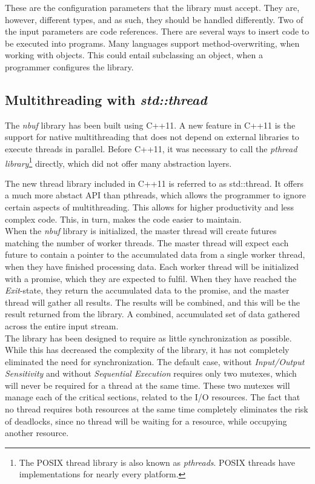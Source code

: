 \documentclass[a4paper]{article}
\newcommand{\nbuf}{\textit{nbuf} }
\begin{document}
These are the configuration parameters that the library must accept. They are, however, different types, and as such, they should be handled differently. Two of the input parameters are code references. There are several ways to insert code to be executed into programs. Many languages support method-overwriting, when working with objects. This could entail subclassing an object, when a programmer configures the library. 



\subsection{Multithreading with \textit{std::thread}}
The \nbuf library has been built using C++11. A new feature in C++11 is the support for native multithreading that does not depend on external libraries to execute threads in parallel. Before C++11, it was necessary to call the \textit{pthread library}\footnote{The POSIX thread library is also known as \textit{pthreads}. POSIX threads have implementations for nearly every platform.} directly, which did not offer many abstraction layers. 

The new thread library included in C++11 is referred to as std::thread. It offers a much more abstact API than pthreads, which allows the programmer to ignore certain aspects of multithreading. This allows for higher productivity and less complex code. This, in turn, makes the code easier to maintain.\\

When the \nbuf library is initialized, the master thread will create futures matching the number of worker threads. The master thread will expect each future to contain a pointer to the accumulated data from a single worker thread, when they have finished processing data. Each worker thread will be initialized with a promise, which they are expected to fulfil. When they have reached the \textit{Exit}-state, they return the accumulated data to the promise, and the master thread will gather all results. The results will be combined, and this will be the result returned from the library. A combined, accumulated set of data gathered across the entire input stream.\\

The library has been designed to require as little synchronization as possible. While this has decreased the complexity of the library, it has not completely eliminated the need for synchronization. The default case, without \textit{Input/Output Sensitivity} and without \textit{Sequential Execution} requires only two mutexes, which will never be required for a thread at the same time. These two mutexes will manage each of the critical sections, related to the I/O resources. The fact that no thread requires both resources at the same time completely eliminates the risk of deadlocks, since no thread will be waiting for a resource, while occupying another resource.\\
\end{document}

